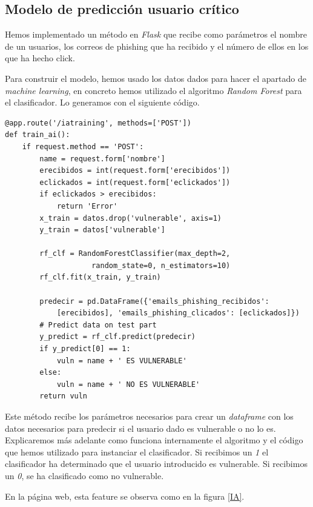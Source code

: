 \documentclass[12pt, a4paper,twoside,titlepage]{article}
\begin{document}
\subsection{Modelo de predicción usuario crítico}
Hemos implementado un método en \emph{Flask} que recibe como parámetros el nombre de un usuarios, los correos de phishing que ha recibido y el número de ellos en los que ha hecho click.

Para construir el modelo, hemos usado los datos dados para hacer el apartado de \emph{machine learning}, en concreto hemos utilizado el algoritmo \emph{Random Forest} para el clasificador. Lo generamos con el siguiente código.

\begin{verbatim}
@app.route('/iatraining', methods=['POST'])
def train_ai():
    if request.method == 'POST':
        name = request.form['nombre']
        erecibidos = int(request.form['erecibidos'])
        eclickados = int(request.form['eclickados'])
        if eclickados > erecibidos:
            return 'Error'
        x_train = datos.drop('vulnerable', axis=1)
        y_train = datos['vulnerable']

        rf_clf = RandomForestClassifier(max_depth=2, 
                    random_state=0, n_estimators=10)
        rf_clf.fit(x_train, y_train)

        predecir = pd.DataFrame({'emails_phishing_recibidos':
            [erecibidos], 'emails_phishing_clicados': [eclickados]})
        # Predict data on test part
        y_predict = rf_clf.predict(predecir)
        if y_predict[0] == 1:
            vuln = name + ' ES VULNERABLE'
        else:
            vuln = name + ' NO ES VULNERABLE'
        return vuln

\end{verbatim}

Este método recibe los parámetros necesarios para crear un \emph{dataframe} con los datos necesarios para predecir si el usuario dado es vulnerable o no lo es. Explicaremos más adelante como funciona internamente el algoritmo y el código que hemos utilizado para instanciar el clasificador. Si recibimos un \emph{1} el clasificador ha determinado que el usuario introducido es vulnerable. Si recibimos un \emph{0}, se ha clasificado como no vulnerable.

En la página web, esta feature se observa como en la figura \ref{IA}.
\end{document}
